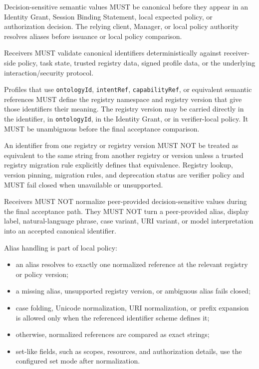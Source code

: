 \documentclass[
]{article}
\providecommand{\tightlist}{%
  \setlength{\itemsep}{0pt}\setlength{\parskip}{0pt}}
\begin{document}
Decision-sensitive semantic values MUST be canonical before they appear
in an Identity Grant, Session Binding Statement, local expected policy,
or authorization decision. The relying client, Manager, or local policy
authority resolves aliases before issuance or local policy comparison.

Receivers MUST validate canonical identifiers deterministically against
receiver-side policy, task state, trusted registry data, signed profile
data, or the underlying interaction/security protocol.

Profiles that use \texttt{ontologyId}, \texttt{intentRef},
\texttt{capabilityRef}, or equivalent semantic references MUST define
the registry namespace and registry version that give those identifiers
their meaning. The registry version may be carried directly in the
identifier, in \texttt{ontologyId}, in the Identity Grant, or in
verifier-local policy. It MUST be unambiguous before the final
acceptance comparison.

An identifier from one registry or registry version MUST NOT be treated
as equivalent to the same string from another registry or version unless
a trusted registry migration rule explicitly defines that equivalence.
Registry lookup, version pinning, migration rules, and deprecation
status are verifier policy and MUST fail closed when unavailable or
unsupported.

Receivers MUST NOT normalize peer-provided decision-sensitive values
during the final acceptance path. They MUST NOT turn a peer-provided
alias, display label, natural-language phrase, case variant, URI
variant, or model interpretation into an accepted canonical identifier.

Alias handling is part of local policy:

\begin{itemize}
\tightlist
\item
  an alias resolves to exactly one normalized reference at the relevant
  registry or policy version;
\item
  a missing alias, unsupported registry version, or ambiguous alias
  fails closed;
\item
  case folding, Unicode normalization, URI normalization, or prefix
  expansion is allowed only when the referenced identifier scheme
  defines it;
\item
  otherwise, normalized references are compared as exact strings;
\item
  set-like fields, such as scopes, resources, and authorization details,
  use the configured set mode after normalization.
\end{itemize}
\end{document}
